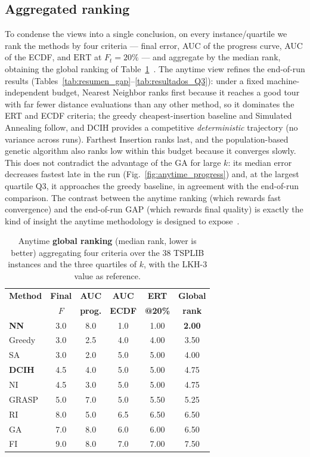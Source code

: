 \documentclass[conference]{IEEEtran}
\begin{document}
\subsection{Aggregated ranking}
To condense the views into a single conclusion, on every instance/quartile we rank
the methods by four criteria --- final error, AUC of the progress curve, AUC of the
ECDF, and $\mathrm{ERT}$ at $F_t=20\%$ --- and aggregate by the median rank,
obtaining the global ranking of Table~\ref{tab:anytime_ranking}~\cite{weise2014benchmarking}.
The anytime view refines the end-of-run results
(Tables~\ref{tab:resumen_gap}--\ref{tab:resultados_Q3}): under a fixed
machine-independent budget, Nearest Neighbor ranks first because it reaches a good
tour with far fewer distance evaluations than any other method, so it dominates the
ERT and ECDF criteria; the greedy cheapest-insertion baseline and Simulated
Annealing follow, and DCIH provides a competitive \emph{deterministic} trajectory
(no variance across runs). Farthest Insertion ranks last, and the population-based
genetic algorithm also ranks low within this budget because it converges slowly.
This does not contradict the advantage of the GA for large $k$: its median error
decreases fastest late in the run (Fig.~\ref{fig:anytime_progress}) and, at the
largest quartile Q3, it approaches the greedy baseline, in agreement with the
end-of-run comparison. The contrast between the anytime ranking (which rewards fast
convergence) and the end-of-run GAP (which rewards final quality) is exactly the
kind of insight the anytime methodology is designed to expose~\cite{weise2014benchmarking}.

\begin{table}[htbp]
\centering
\caption{Anytime \textbf{global ranking} (median rank, lower is better) aggregating
four criteria over the 38 TSPLIB instances and the three quartiles of $k$, with the
LKH-3 value as reference.}
\label{tab:anytime_ranking}
\begin{tabular}{|l|c|c|c|c|c|}
\hline
\textbf{Method} & \textbf{Final} & \textbf{AUC} & \textbf{AUC} & \textbf{ERT} & \textbf{Global} \\
                & \textbf{$F$}   & \textbf{prog.}& \textbf{ECDF}& \textbf{@20\%}& \textbf{rank} \\
\hline
\textbf{NN}     & 3.0 & 8.0 & 1.0 & 1.00 & \textbf{2.00} \\
Greedy          & 3.0 & 2.5 & 4.0 & 4.00 & 3.50 \\
SA              & 3.0 & 2.0 & 5.0 & 5.00 & 4.00 \\
\textbf{DCIH}   & 4.5 & 4.0 & 5.0 & 5.00 & 4.75 \\
NI              & 4.5 & 3.0 & 5.0 & 5.00 & 4.75 \\
GRASP           & 5.0 & 7.0 & 5.0 & 5.50 & 5.25 \\
RI              & 8.0 & 5.0 & 6.5 & 6.50 & 6.50 \\
GA              & 7.0 & 8.0 & 6.0 & 6.00 & 6.50 \\
FI              & 9.0 & 8.0 & 7.0 & 7.00 & 7.50 \\
\hline
\end{tabular}
\end{table}
\end{document}
